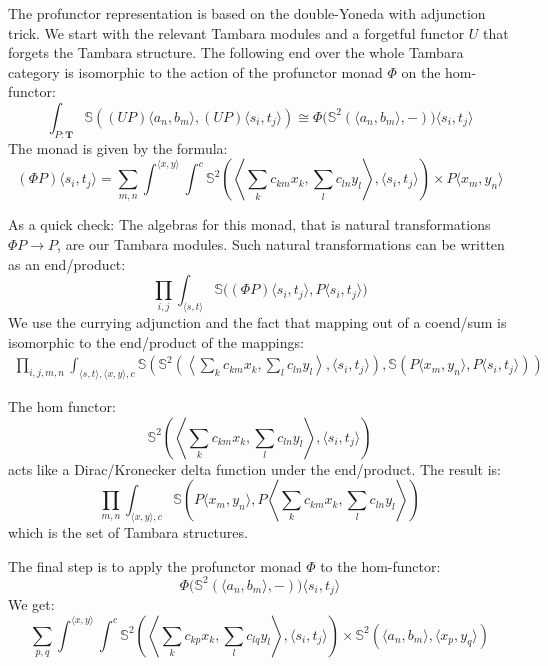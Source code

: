 \documentclass[11pt]{amsart}
\begin{document}
The profunctor representation is based on the double-Yoneda with adjunction trick. We start with the relevant Tambara modules and a forgetful functor $U$ that forgets the Tambara structure. The following end over the whole Tambara category is isomorphic to the action of the profunctor monad $\Phi$ on the hom-functor:
\[ \int_{P \colon \mathbf{T}} \mathbb{S}\left ( (U P)\langle a_n, b_m \rangle, (U P) \langle s_i, t_j \rangle \right) \cong \Phi \big( \mathbb{S}^2(\langle a_n, b_m \rangle, -) \big)  \langle s_i, t_j \rangle \]
The monad is given by the formula:
\[ (\Phi P) \langle s_i, t_j \rangle = \sum_{m, n} \int^{\langle x, y \rangle} \int^{c}  
    \mathbb{S}^2
      \left(\left \langle \sum_k c_{k m}  x_k
    , \sum_l c_{l n} y_l \right \rangle,  
        \langle s_i, t_j \rangle \right)
     \times  P\langle x_m, y_n \rangle\]

As a quick check: The algebras for this monad, that is natural transformations $\Phi P \to P$, are our Tambara modules. Such natural transformations can be written as an end/product:
\[ \prod_{i, j} \int_{\langle s, t\rangle} \mathbb{S} \big((\Phi P) \langle s_i, t_j \rangle, P \langle s_i, t_j \rangle \big) \]
We use the currying adjunction and the fact that mapping out of a coend/sum is isomorphic to the end/product of the mappings:
 \begin{align*}
\prod_{i, j, m, n} \int_{\langle s, t\rangle, \langle x, y \rangle, c}  \mathbb{S} \left(
    \mathbb{S}^2
      \left(\left \langle \sum_k c_{k m}  x_k
    , \sum_l c_{l n} y_l \right \rangle,  
        \langle s_i, t_j \rangle \right),
     \mathbb{S}(  P\langle x_m, y_n \rangle, P \langle s_i, t_j \rangle ) \right)
\end{align*}

The hom functor:
\[ \mathbb{S}^2  \left(\left \langle 
      \sum_k c_{k m}  x_k
    , \sum_l c_{l n} y_l \right \rangle,  
        \langle s_i, t_j \rangle \right) \]
acts like a Dirac/Kronecker delta function under the end/product. The result is:
\[ \prod_{m, n} \int_{\langle x, y \rangle , c} \mathbb{S} \left(P\langle x_m, y_n \rangle, P \left \langle \sum_k c_{k m}  x_k  , \sum_l c_{l n} y_l \right \rangle \right) \]
which is the set of Tambara structures.

The final step is to apply the profunctor monad $\Phi$ to the hom-functor:
\[ \Phi \big( \mathbb{S}^2(\langle a_n, b_m \rangle, -) \big)  \langle s_i, t_j \rangle \]
We get:
\[ \sum_{p, q} \int^{\langle x, y \rangle} \int^{c}  
    \mathbb{S}^2
      \left(\left \langle \sum_k c_{k p}  x_k
    , \sum_l c_{l q} y_l \right \rangle,  
        \langle s_i, t_j \rangle \right)
     \times  \mathbb{S}^2( \langle a_n, b_m \rangle, \langle x_p, y_q \rangle)\]
\end{document}
